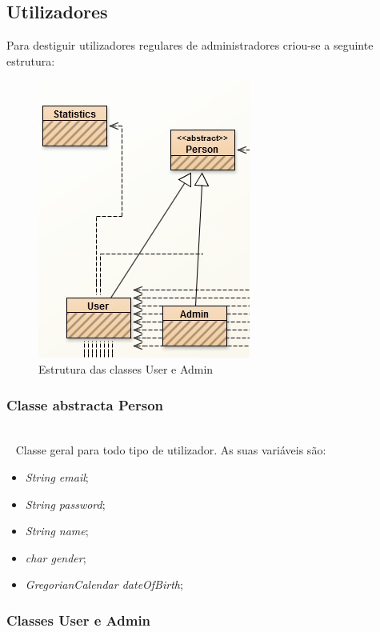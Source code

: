 \documentclass[10pt,notitlepage]{article}
\begin{document}
\subsection{Utilizadores}
Para destiguir utilizadores regulares de administradores criou-se a seguinte estrutura:
~\\
\begin{figure}[htb]
\centering
\includegraphics[scale=0.6]{Statsfinal.jpg}
\caption{Estrutura das classes User e Admin}
\end{figure}


\subsubsection{Classe abstracta Person}

~\\~
Classe geral para todo tipo de utilizador. As suas variáveis são:
\begin{itemize}
\item \textit{String email};
\item \textit{String password};
\item \textit{String name};
\item \textit{char gender};
\item \textit{GregorianCalendar dateOfBirth};
\end{itemize}

\subsubsection{Classes User e Admin}
\end{document}
